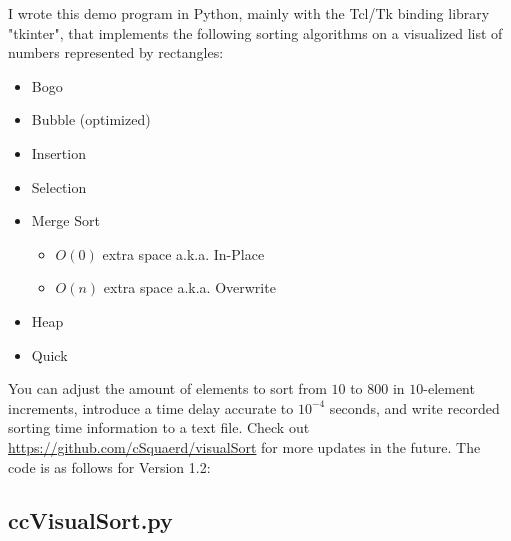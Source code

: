 \documentclass[12pt]{article}
\begin{document}
	I wrote this demo program in Python, mainly with the Tcl/Tk binding library "tkinter", that implements the following sorting algorithms on a visualized list of numbers represented by rectangles:
	\begin{itemize}
		\item Bogo
		\item Bubble (optimized)
		\item Insertion
		\item Selection
		\item Merge Sort
		\begin{itemize}
			\item $O(0)$ extra space a.k.a. In-Place
			\item $O(n)$ extra space a.k.a. Overwrite
		\end{itemize}
		\item Heap
		\item Quick
	\end{itemize}

	You can adjust the amount of elements to sort from $10$ to $800$ in $10$-element increments, introduce a time delay accurate to $10^{-4}$ seconds, and write recorded sorting time information to a text file. Check out \url{https://github.com/cSquaerd/visualSort} for more updates in the future. The code is as follows for Version 1.2:

	\subsection{ccVisualSort.py}
	\small
	
	\pagebreak

	
	\pagebreak

	
	\pagebreak

	
	\pagebreak

	
	\pagebreak

	
	\pagebreak
\end{document}
